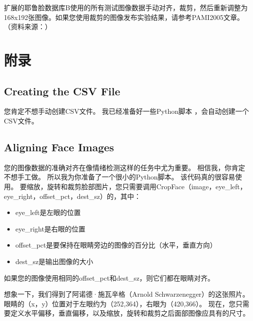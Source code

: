 \documentclass[UTF8]{ctexart}
\begin{document}
扩展的耶鲁脸数据库B使用的所有测试图像数据手动对齐，裁剪，然后重新调整为168x192张图像。如果您使用裁剪的图像发布实验结果，请参考PAMI2005文章。 （资料来源：{\color{blue}{http://vision.ucsd.edu/~leekc/ExtYaleDatabase/ExtYaleB.html}}）

\section{附录}
\subsection{Creating the CSV File}
您肯定不想手动创建CSV文件。 我已经准备好一些Python脚本 {\color{blue}{src/create\_csv.py}}，会自动创建一个CSV文件。 

\subsection{Aligning Face Images}
您的图像数据的准确对齐在像情绪检测这样的任务中尤为重要。 相信我，你肯定不想手工做。 所以我为你准备了一个很小的Python脚本。 该代码真的很容易使用。 要缩放，旋转和裁剪脸部图片，您只需要调用CropFace（image，eye\_left，eye\_right，offset\_pct，dest\_sz）的，其中：
\begin{itemize}
    	\item  eye\_left是左眼的位置
   	\item  eye\_right是右眼的位置
     	\item  offset\_pct是要保持在眼睛旁边的图像的百分比（水平，垂直方向）
    	\item  dest\_sz是输出图像的大小
\end{itemize}
如果您的图像使用相同的offset\_pct和dest\_sz，则它们都在眼睛对齐。

想象一下，我们得到了阿诺德·施瓦辛格（Arnold Schwarzenegger）的这张照片。 眼睛的（x，y）位置对于左眼约为（252,364），右眼为（420,366）。 现在，您只需要定义水平偏移，垂直偏移，以及缩放，旋转和裁剪之后面部图像应具有的尺寸。
\end{document}
